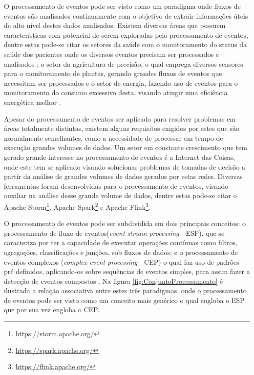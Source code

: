 \documentclass[ti,table]{texufpel} %
\begin{document}
O processamento de eventos pode ser visto como um paradigma onde fluxos de eventos são analisados continuamente com o objetivo de extrair informações úteis de alto nível destes dados analisados. Existem diversas áreas que possuem características com potencial de serem exploradas pelo processamento de eventos, dentre estas pode-se citar os setores da saúde com o monitoramento do status da saúde dos pacientes onde os diversos eventos precisam ser processados e analisados \cite{weiner2008health}; o setor da agricultura de precisão, o qual emprega diversos sensores para o monitoramento de plantas, gerando grandes fluxos de eventos que necessitam ser processados \cite{garcia2011wireless} e o setor de energia, fazendo uso de eventos para o monitoramento do consumo excessivo desta, visando atingir uma eficiência energética melhor \cite{vijayaraghavan2010automated}.  

  

Apesar do processamento de eventos ser aplicado para resolver problemas em áreas totalmente distintas, existem alguns requisitos exigidos por estes que são normalmente semelhantes, como a necessidade de processar em tempo de execução grandes volumes de dados. Um setor em constante  crescimento que tem gerado grande interesse no processamento de eventos é a Internet das Coisas, onde este tem se aplicado visando solucionar problemas de tomadas de decisão a partir da análise de grandes volumes de dados gerados por estas redes. Diversas ferramentas foram desenvolvidas para o processamento de eventos, visando auxiliar na análise desse grande volume de dados, dentre estas pode-se citar o Apache Storm\footnote{\url{https://storm.apache.org/}}, Apache Spark\footnote{\url{https://spark.apache.org/}} e Apache Flink\footnote{\url{https://flink.apache.org/}}. 


O processamento de eventos pode ser subdividida em dois principais conceitos: o processamento de fluxo de eventos(\textit{event stream processing} - ESP), que se caracteriza por ter a capacidade de executar operações contínuas como filtros, agregações, classificações e junções, sob fluxos de dados; e o processamento de eventos complexos (\textit{complex event processing} - CEP) o qual faz uso de padrões pré definidos, aplicando-os sobre sequências de eventos simples, para assim fazer a detecção de eventos compostos \cite{dayarathna2018recent}. Na figura \ref{fig:ConjuntoProcessamento} é ilustrada a relação associativa entre estes três paradigmas, onde o processamento de eventos pode ser visto como um conceito mais genérico o qual engloba o ESP que por sua vez engloba o CEP. 
\end{document}
